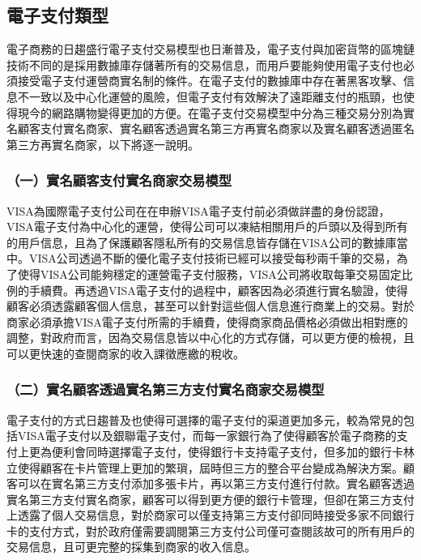 	\subsection{電子支付類型}
	電子商務的日趨盛行電子支付交易模型也日漸普及，電子支付與加密貨幣的區塊鏈技術不同的是採用數據庫存儲著所有的交易信息，而用戶要能夠使用電子支付也必須接受電子支付運營商實名制的條件。在電子支付的數據庫中存在著黑客攻擊、信息不一致以及中心化運營的風險，但電子支付有效解決了遠距離支付的瓶頸，也使得現今的網路購物變得更加的方便。在電子支付交易模型中分為三種交易分別為實名顧客支付實名商家、實名顧客透過實名第三方再實名商家以及實名顧客透過匿名第三方再實名商家，以下將逐一說明。

		\subsubsection{（一）實名顧客支付實名商家交易模型}
		VISA為國際電子支付公司在在申辦VISA電子支付前必須做詳盡的身份認證，VISA電子支付為中心化的運營，使得公司可以凍結相關用戶的戶頭以及得到所有的用戶信息，且為了保護顧客隱私所有的交易信息皆存儲在VISA公司的數據庫當中。VISA公司透過不斷的優化電子支付技術已經可以接受每秒兩千筆的交易，為了使得VISA公司能夠穩定的運營電子支付服務，VISA公司將收取每筆交易固定比例的手續費。再透過VISA電子支付的過程中，顧客因為必須進行實名驗證，使得顧客必須透露顧客個人信息，甚至可以針對這些個人信息進行商業上的交易。對於商家必須承擔VISA電子支付所需的手續費，使得商家商品價格必須做出相對應的調整，對政府而言，因為交易信息皆以中心化的方式存儲，可以更方便的檢視，且可以更快速的查閱商家的收入課徵應繳的稅收。
		

		\subsubsection{（二）實名顧客透過實名第三方支付實名商家交易模型}
		電子支付的方式日趨普及也使得可選擇的電子支付的渠道更加多元，較為常見的包括VISA電子支付以及銀聯電子支付，而每一家銀行為了使得顧客於電子商務的支付上更為便利會同時選擇電子支付，使得銀行卡支持電子支付，但多加的銀行卡林立使得顧客在卡片管理上更加的繁瑣，屆時但三方的整合平台變成為解決方案。顧客可以在實名第三方支付添加多張卡片，再以第三方支付進行付款。實名顧客透過實名第三方支付實名商家，顧客可以得到更方便的銀行卡管理，但卻在第三方支付上透露了個人交易信息，對於商家可以僅支持第三方支付卻同時接受多家不同銀行卡的支付方式，對於政府僅需要調閱第三方支付公司僅可查閱該故可的所有用戶的交易信息，且可更完整的採集到商家的收入信息。
		
